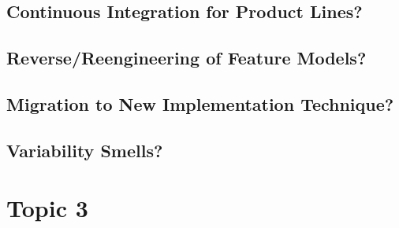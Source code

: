 \subsection{Continuous Integration for Product Lines?}
\subsection{Reverse/Reengineering of Feature Models?}
\subsection{Migration to New Implementation Technique?}
\subsection{Variability Smells?}

%

\lessonslearned{
	\item \ldots
}{
	\item \ldots
}{
	\ldots
}

\sectionend

\section{Topic 3}



\lessonslearned{
	\item \ldots
}{
	\item \ldots
}{
	\ldots
}




